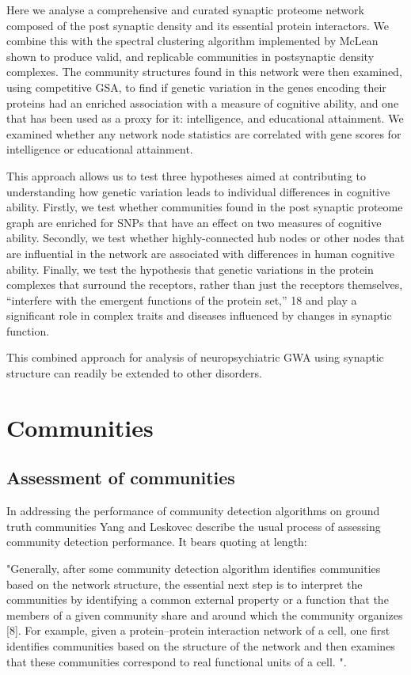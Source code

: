 Here we analyse a comprehensive and curated synaptic proteome network composed of the post synaptic density and its essential protein interactors. We combine this with the spectral clustering algorithm implemented by McLean shown to produce valid, and replicable communities in postsynaptic density complexes. \cite{mclean2016improved}  The community structures found in this network were then examined, using competitive GSA, to find if genetic variation in the genes encoding their proteins had an enriched association with a measure of cognitive ability, and one that has been used as a proxy for it: intelligence, and educational attainment. We examined whether any network node statistics are correlated with gene scores for intelligence or educational attainment.

This approach allows us to test three hypotheses aimed at contributing to understanding how genetic variation leads to individual differences in cognitive ability. Firstly, we test whether communities found in the post synaptic proteome graph are enriched for SNPs that have an effect on two measures of cognitive ability. Secondly, we test whether highly-connected hub nodes or other nodes that are influential in the network are associated with differences in human cognitive ability. Finally, we test the hypothesis that genetic variations in the protein complexes that surround the receptors, rather than just the receptors themselves, “interfere with the emergent functions of the protein set‚” 18  and play  a significant role in complex traits and diseases influenced by changes in synaptic function. 

This combined approach for analysis of neuropsychiatric GWA using synaptic structure can readily be extended to other disorders. 


\section{Communities}
\label{sec:alternate intro}
\subsection{Assessment of communities}

In addressing the performance of community detection algorithms on ground truth communities Yang and Leskovec describe the usual process of assessing community detection performance. It bears quoting at length:

"Generally, after some community detection algorithm identifies communities based on the network structure, the essential next step is to interpret the communities by identifying a common external property or a function that the members of a given community share and around which the community organizes [8]. For example, given a protein–protein interaction network of a cell, one first identifies communities based on the structure of the network and then examines that these communities correspond to real functional units of a cell. ". \cite{yang2015defining}

